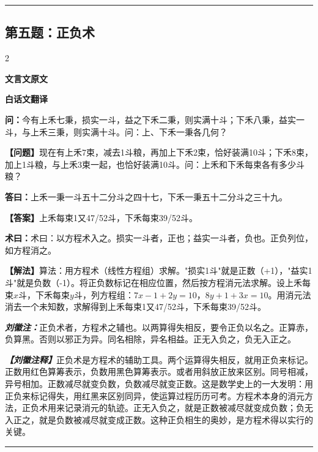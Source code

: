 \documentclass[10pt,a4paper]{article}
\newcommand{\wen}[1]{\textbf{\color{problemcolor}问：}#1\par}
\newcommand{\da}[1]{\textbf{答曰：}#1\par}
\newcommand{\shu}[1]{\textbf{术曰：}#1\par}
\newcommand{\liuhui}[1]{{\color{commentarycolor}\textit{\textbf{刘徽注：}}#1\par}}
\newcommand{\classicalheader}[1]{{\centering\large\bfseries\color{classicalcolor} #1\par\vspace{0.5em}}}
\newcommand{\wenmodern}[1]{\textbf{\color{moderncolor}【问题】}#1\par}
\newcommand{\damodern}[1]{\textbf{【答案】}#1\par}
\newcommand{\shumodern}[1]{\textbf{【解法】}#1\par}
\newcommand{\liuhuimodern}[1]{{\color{commentarycolor}\textit{\textbf{【刘徽注释】}}#1\par}}
\newcommand{\modernheader}[1]{{\centering\large\bfseries\color{moderncolor} #1\par\vspace{0.5em}}}
\newcommand{\problemsec}[1]{\subsection*{#1}}
\begin{document}
\vspace{0.3cm}
\hrule
\vspace{0.3cm}

\problemsec{第五题：正负术}
\begin{paracol}{2}
\classicalheader{文言文原文}
\switchcolumn
\modernheader{白话文翻译}
\switchcolumn*

\wen{今有上禾七秉，损实一斗，益之下禾二秉，则实满十斗；下禾八秉，益实一斗，与上禾三秉，则实满十斗。问：上、下禾一秉各几何？}

\switchcolumn

\wenmodern{现在有上禾7束，减去1斗粮，再加上下禾2束，恰好装满10斗；下禾8束，加上1斗粮，与上禾3束一起，也恰好装满10斗。问：上禾和下禾每束各有多少斗粮？}

\switchcolumn*

\da{上禾一秉一斗五十二分斗之四十七，下禾一秉五十二分斗之三十九。}

\switchcolumn

\damodern{上禾每束1又47/52斗，下禾每束39/52斗。}

\switchcolumn*

\shu{术曰：以方程术入之。损实一斗者，正也；益实一斗者，负也。正负列位，如方程消之。}

\switchcolumn

\shumodern{算法：用方程术（线性方程组）求解。"损实1斗"就是正数（+1），"益实1斗"就是负数（-1）。将正负数标记在相应位置，然后按方程消元法求解。设上禾每束$x$斗，下禾每束$y$斗，列方程组：$7x-1+2y=10$，$8y+1+3x=10$。用消元法消去一个未知数，求解得到上禾每束1又47/52斗，下禾每束39/52斗。}

\switchcolumn*

\liuhui{正负术者，方程术之辅也。以两算得失相反，要令正负以名之。正算赤，负算黑。否则以邪正为异。同名相除，异名相益。正无入负之，负无入正之。}

\switchcolumn

\liuhuimodern{正负术是方程术的辅助工具。两个运算得失相反，就用正负来标记。正数用红色算筹表示，负数用黑色算筹表示。或者用斜放正放来区别。同号相减，异号相加。正数减尽就变负数，负数减尽就变正数。这是数学史上的一大发明：用正负来标记得失，用红黑来区别同异，使运算过程历历可考。方程术本身的消元方法，正负术用来记录消元的轨迹。正无入负之，就是正数被减尽就变成负数；负无入正之，就是负数被减尽就变成正数。这种正负相生的奥妙，是方程术得以实行的关键。}

\end{paracol}

\vspace{0.3cm}
\hrule
\vspace{0.3cm}
\end{document}
